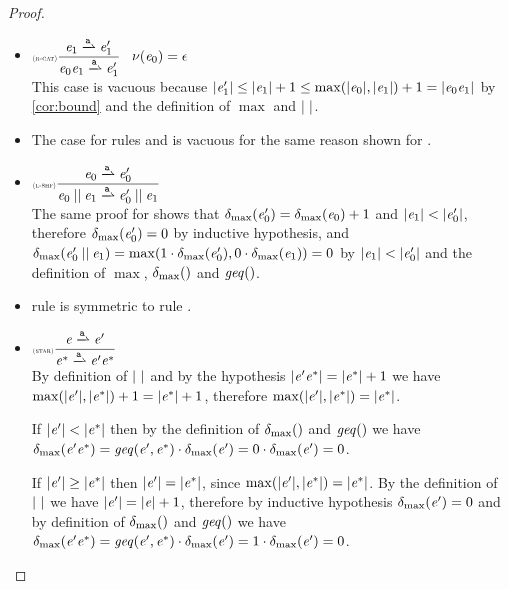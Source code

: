 \begin{proof}
\begin{description}
\begin{itemize}
    \item $\Rule{r-cat}{\re_1\parDer{\sym}\re'_1}{\re_0\catop\re_1\parDer{\sym}\re'_1}{\hasEps{\re_0}=\eps}$\\[2ex]
          This case is vacuous because ${\mid}{\mathit {e}_1'}{\mid}\leq{\mid}{\ensuremath{\mathit {e}}_1}{\mid}+1\leq\max({\mid}{\mathit {e}_0}{\mid},{\mid}{\mathit {e}_1}{\mid})+1={\mid}{\mathit {e}_0\mathit {e}_1}{\mid}$ by \cref{cor:bound} and the definition of $\max$ and ${\mid}{\ }{\mid}$.

    \item The case for rules  and  is vacuous for the same reason shown for .
    \item $\Rule{l-shf}{\re_0\parDer{\sym}\re'_0}{\re_0\shuffleop\re_1\parDer{\sym}\re'_0\shuffleop\re_1}{}$\\[2ex]
          The same proof for  shows that ${\delta_{\max}}({\mathit {e}_0'})={\delta_{\max}}({\mathit {e}_0})+1$ and ${\mid}{\mathit {e}_1}{\mid}<{\mid}{\mathit {e}'_0}{\mid}$, therefore ${\delta_{\max}}({\mathit {e}'_0})=0$ by inductive hypothesis, and ${\delta_{\max}}({\mathit {e}'_0\mathbin{||}\mathit {e}_1})=\max(1\cdot{\delta_{\max}}({\mathit {e}_0'}),0\cdot{\delta_{\max}}({\mathit {e}_1}))=0$ by ${\mid}{\mathit {e}_1}{\mid}<{\mid}{\mathit {e}'_0}{\mid}$ and the definition of $\max$, ${\delta_{\max}}({})$ and $\mathit{geq}()$.
    \item rule  is symmetric to rule .
    \item $\Rule{star}{\re\parDer{\sym}\re'}{\starop{\re}\parDer{\sym}\re'\starop{\re}}{}$\\[2ex]
          By definition of ${\mid}{\ }{\mid}$ and by the hypothesis ${\mid}{\mathit {e}'{\mathit {e}}^*}{\mid}={\mid}{{\mathit {e}}^*}{\mid}+1$ we have
          $\max({\mid}{\mathit {e}'}{\mid},{\mid}{{\mathit {e}}^*}{\mid})+1={\mid}{{\mathit {e}}^*}{\mid}+1$, therefore
          $\max({\mid}{\mathit {e}'}{\mid},{\mid}{{\mathit {e}}^*}{\mid})={\mid}{{\mathit {e}}^*}{\mid}$.

          If ${\mid}{\mathit {e}'}{\mid}<{\mid}{{\mathit {e}}^*}{\mid}$ then by the definition of ${\delta_{\max}}({})$ and $\mathit{geq}()$ we have ${\delta_{\max}}({\mathit {e}'{\mathit {e}}^*})=\mathit{geq}({\mathit {e}'},{{\mathit {e}}^*})\cdot{\delta_{\max}}({\mathit {e}'})=0\cdot{\delta_{\max}}({\mathit {e}'})=0$.

          If ${\mid}{\mathit {e}'}{\mid}\geq{\mid}{{\ensuremath{\mathit {e}}}^*}{\mid}$ then ${\mid}{\mathit {e}'}{\mid}={\mid}{{\mathit {e}}^*}{\mid}$, since $\max({\mid}{\mathit {e}'}{\mid},{\mid}{{\mathit {e}}^*}{\mid})={\mid}{{\mathit {e}}^*}{\mid}$.
          By the definition of ${\mid}{\ }{\mid}$ we have ${\mid}{\mathit {e}'}{\mid}={\mid}{\mathit {e}}{\mid}+1$, therefore
          by inductive hypothesis ${\delta_{\max}}({\mathit {e}'})=0$ and by definition of ${\delta_{\max}}({})$ and $\mathit{geq}()$ we have ${\delta_{\max}}({\mathit {e}'{\mathit {e}}^*})=\mathit{geq}({\mathit {e}'},{{\mathit {e}}^*})\cdot{\delta_{\max}}({\mathit {e}'})=1\cdot{\delta_{\max}}({\mathit {e}'})=0$.
   \end{itemize}
 \end{description}
\end{proof}

